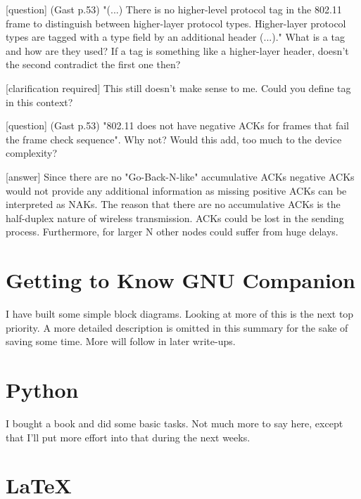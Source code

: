 \documentclass{article}
\begin{document}
	\bigskip
	
	\color{blue}
	[question] (Gast p.53) "(...) There is no higher-level protocol tag in the 802.11 frame to distinguish between higher-layer protocol types. Higher-layer protocol types are tagged with a type field by an additional header (...)." What is a tag and how are they used? If a tag is something like a higher-layer header, doesn't the second contradict the first one then?
	\color{black}
	
	\bigskip
	
	\color{orange}
	[clarification required] This still doesn't make sense to me. Could you define tag in this context?
	\color{black}
	
	\bigskip

	\color{blue}
	[question] (Gast p.53) "802.11 does not have negative ACKs for frames that fail the frame check sequence". Why not? Would this add, too much to the device complexity? 
	\color{black}
	
	\bigskip
	
	\color{red}
	[answer] Since there are no "Go-Back-N-like" accumulative ACKs negative ACKs would not provide any additional information as missing positive ACKs can be interpreted as NAKs. The reason that there are no accumulative ACKs is the half-duplex nature of wireless transmission. ACKs could be lost in the sending process.
	Furthermore, for larger N other nodes could suffer from huge delays.
	\color{black}
	
	\section{Getting to Know GNU Companion}
	
	I have built some simple block diagrams. Looking at more of this is the next top priority. A more detailed description is omitted in this summary for the sake of saving some time. More will follow in later write-ups.

	\section{Python}
	
	I bought a book and did some basic tasks. Not much more to say here, except that I'll put more effort into that during the next weeks. 
	
	\section{\LaTeX}
	
\end{document}
